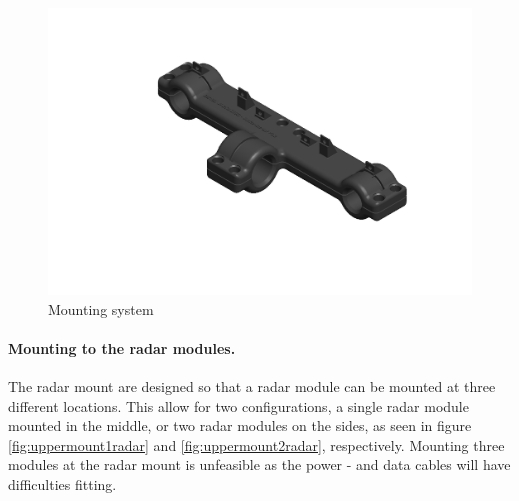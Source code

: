 \begin{figure}[H]
    \centering
    \includegraphics[scale=0.5]{Figures/CAD/mount0radar.PNG}
    \caption{Mounting system}
    \label{fig:mount0radar}
\end{figure}
\paragraph{Mounting to the radar modules.}
The radar mount are designed so that a radar module can be mounted at three different locations. This allow for two configurations, a single radar module mounted in the middle, or two radar modules on the sides, as seen in figure \ref{fig:uppermount1radar} and \ref{fig:uppermount2radar}, respectively. Mounting three modules at the radar mount is unfeasible as the power - and data cables will have difficulties fitting. 

